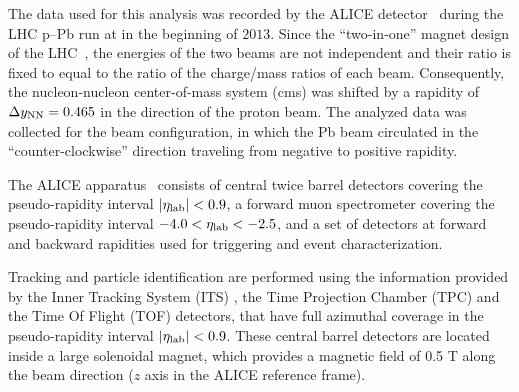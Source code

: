 The data used for this analysis was recorded by the ALICE detector~\cite{Aamodt:2008zz} during the LHC p--Pb run at  in the beginning of $2013$. Since the ``two-in-one'' magnet design of the LHC~\cite{Evans:2008zzb}, the energies of the two beams are not independent and their ratio is fixed to equal to the ratio of the charge/mass ratios of each beam. Consequently, the nucleon-nucleon center-of-mass system (cms) was shifted by a rapidity of $\Delta y_{\rm NN}=0.465$ in the direction of the proton beam. The analyzed data was collected for the beam configuration, in which the Pb beam circulated in the ``counter-clockwise'' direction traveling from negative to positive rapidity.

The ALICE apparatus~\cite{Aamodt:2008zz} consists of central twice barrel detectors covering the pseudo-rapidity interval $|\eta_{\rm lab}|<0.9$, a forward muon spectrometer covering the pseudo-rapidity interval $-4.0<\eta_{\rm lab}<-2.5$, and a set of detectors at forward and backward rapidities used for triggering and event characterization. 

Tracking and particle identification are performed using the information provided by the Inner Tracking System (ITS) \cite{Aamodt:2010aa}, the Time Projection Chamber (TPC) \cite{Alme:2010ke} and the Time Of Flight (TOF) \cite{Akindinov:2013tea} detectors, that have full azimuthal coverage in the pseudo-rapidity interval $|\eta_{\rm lab}|<0.9$. 
These central barrel detectors are located inside a large solenoidal magnet, which provides a magnetic field of 0.5 T along the beam direction ($z$ axis in the ALICE reference frame). 

